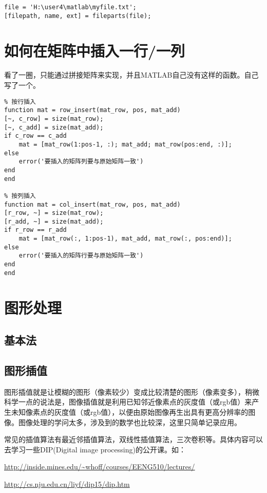 \begin{verbatim}
file = 'H:\user4\matlab\myfile.txt';
[filepath, name, ext] = fileparts(file);
\end{verbatim}

\section{如何在矩阵中插入一行/一列}

看了一圈，只能通过拼接矩阵来实现，并且MATLAB自己没有这样的函数。自己写了一个。

\begin{verbatim}
% 按行插入
function mat = row_insert(mat_row, pos, mat_add)
[~, c_row] = size(mat_row);
[~, c_add] = size(mat_add);
if c_row == c_add
    mat = [mat_row(1:pos-1, :); mat_add; mat_row(pos:end, :)];
else
    error('要插入的矩阵列要与原始矩阵一致')
end
end

% 按列插入
function mat = col_insert(mat_row, pos, mat_add)
[r_row, ~] = size(mat_row);
[r_add, ~] = size(mat_add);
if r_row == r_add
    mat = [mat_row(:, 1:pos-1), mat_add, mat_row(:, pos:end)];
else
    error('要插入的矩阵行要与原始矩阵一致')
end
end
\end{verbatim}

\section{图形处理}

\subsection{基本法}

\subsection{图形插值}

图形插值就是让模糊的图形（像素较少）变成比较清楚的图形（像素变多），稍微科学一点的说法是，图像插值就是利用已知邻近像素点的灰度值（或rgb值）来产生未知像素点的灰度值（或rgb值），以便由原始图像再生出具有更高分辨率的图像。图像处理的学问太多，涉及到的数学也比较深，这里只简单记录应用。

常见的插值算法有最近邻插值算法，双线性插值算法，三次卷积等。具体内容可以去学习一些DIP(Digital image processing)的公开课。如：

\url{http://inside.mines.edu/~whoff/courses/EENG510/lectures/}

\url{http://cs.nju.edu.cn/liyf/dip15/dip.htm}

